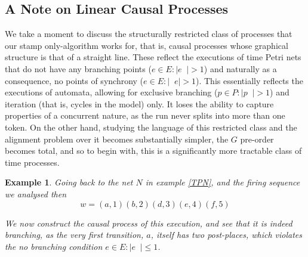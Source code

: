 \documentclass[conference]{IEEEtran}
\DeclareMathOperator*{\pre}{^\bullet}
\newtheorem{example}{Example}
\begin{document}
	\subsection{A Note on Linear Causal Processes}
	We take a moment to discuss the structurally restricted class of processes that our stamp only-algorithm works for, that is, causal processes whose graphical structure  is that of a straight line. 
	These reflect the executions of time Petri nets that do not have any branching points ($e \in E : |e \pre | > 1$) and naturally as a consequence, no points of synchrony ($e \in E : |\pre e| > 1$). 
	This essentially reflects the executions of automata, allowing for exclusive branching ($p \in P : |p \pre| > 1$) and iteration (that is, cycles in the model) only. 
	It loses the ability to capture properties of a concurrent nature, as the run never splits into more than one token. 
	On the other hand, studying the language of this restricted class and the alignment problem over it becomes substantially simpler, the $G$ pre-order becomes total, and so to begin with, this is a significantly more tractable class of time processes. 
	
	\begin{example}\label{Branchingcp}
		Going back to the net $N$ in example \ref{TPN}, and the firing sequence we analysed then $$w = (a, 1)(b, 2)(d, 3)(e, 4)(f,5)$$ 
		
		We now construct the causal process of this execution, and see that it is indeed branching, as the very first transition, $a$, itself has two post-places, which violates the no branching condition $e \in E : |e \pre | \leq  1$. 
	\end{example}
	
\end{document}
